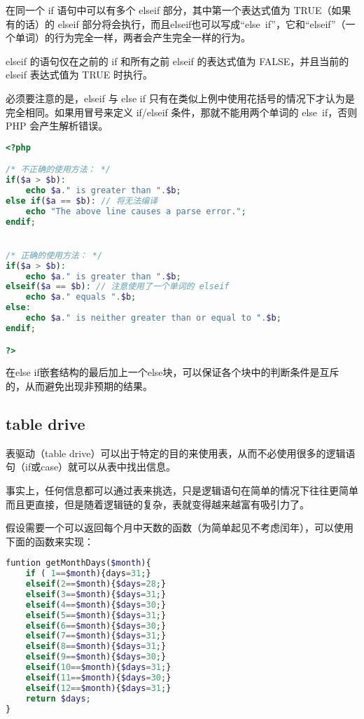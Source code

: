 在同一个 if 语句中可以有多个 elseif 部分，其中第一个表达式值为 TRUE（如果有的话）的 elseif 部分将会执行，而且elseif也可以写成“else~if”，它和“elseif”（一个单词）的行为完全一样，两者会产生完全一样的行为。

elseif 的语句仅在之前的 if 和所有之前 elseif 的表达式值为 FALSE，并且当前的 elseif 表达式值为 TRUE 时执行。

必须要注意的是，elseif 与 else if 只有在类似上例中使用花括号的情况下才认为是完全相同。如果用冒号来定义 if/elseif 条件，那就不能用两个单词的 else~if，否则 PHP 会产生解析错误。

\begin{lstlisting}[language=PHP]
<?php

/* 不正确的使用方法： */
if($a > $b):
    echo $a." is greater than ".$b;
else if($a == $b): // 将无法编译
    echo "The above line causes a parse error.";
endif;


/* 正确的使用方法： */
if($a > $b):
    echo $a." is greater than ".$b;
elseif($a == $b): // 注意使用了一个单词的 elseif
    echo $a." equals ".$b;
else:
    echo $a." is neither greater than or equal to ".$b;
endif;

?>
\end{lstlisting}

在else if嵌套结构的最后加上一个else块，可以保证各个块中的判断条件是互斥的，从而避免出现非预期的结果。


\subsection{table drive}

表驱动（table drive）可以出于特定的目的来使用表，从而不必使用很多的逻辑语句（if或case）就可以从表中找出信息。

事实上，任何信息都可以通过表来挑选，只是逻辑语句在简单的情况下往往更简单而且更直接，但是随着逻辑链的复杂，表就变得越来越富有吸引力了。

假设需要一个可以返回每个月中天数的函数（为简单起见不考虑闰年），可以使用下面的函数来实现：


\begin{lstlisting}[language=PHP]
funtion getMonthDays($month){
	if ( 1==$month){days=31;}
	elseif(2==$month){$days=28;}
	elseif(3==$month){$days=31;}
	elseif(4==$month){$days=30;}
	elseif(5==$month){$days=31;}
	elseif(6==$month){$days=30;}
	elseif(7==$month){$days=31;}
	elseif(8==$month){$days=31;}
	elseif(9==$month){$days=30;}
	elseif(10==$month){$days=31;}
	elseif(11==$month){$days=30;}
	elseif(12==$month){$days=31;}
	return $days;
}
\end{lstlisting}

